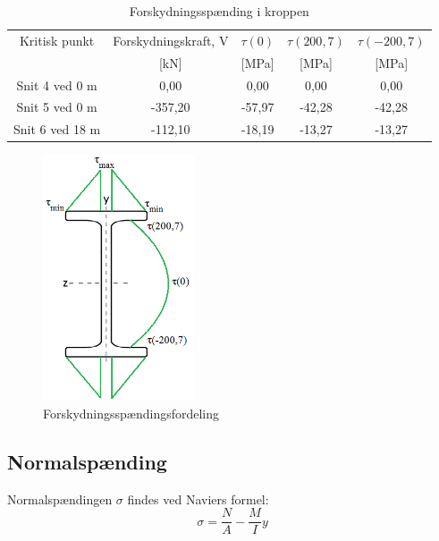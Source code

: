 \begin{table}
	\begin{center}
		\begin{tabular}{c c c c c }
			\hline
			Kritisk punkt   & Forskydningskraft, V & $\tau(0)$ & $\tau(200,7)$ & $\tau(-200,7)$ \\ 
			& [kN] & [MPa] & [MPa] & [MPa] \\ \hline
			Snit 4 ved 0 m  & 0,00                       & 0,00       & 0,00          & 0,00                  \\ \hline
			Snit 5 ved 0 m  & -357,20                 & -57,97  & -42,28     & -42,28     \\ \hline
			Snit 6 ved 18 m & -112,10                 & -18,19  & -13,27     & -13,27       \\ \hline
		\end{tabular}
		\caption{Forskydningsspænding i kroppen}
		\label{tab:kroppen}
	\end{center}
\end{table}

\begin{figure}[H]
	\centering
	\includegraphics[width=0.4\textwidth]{billeder/forskydningsfordeling.png}
	\caption{Forskydningsspændingsfordeling}
	\label{fig:forskydfordeling}
\end{figure}

\subsection{Normalspænding}
Normalspændingen $\sigma$ findes ved Naviers formel:
\begin{equation}
\sigma = \frac{N}{A} - \frac{M}{I} y
\end{equation}

